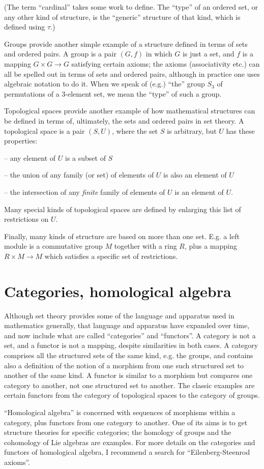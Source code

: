 \documentclass[12pt]{article}
\begin{document}
(The term ``cardinal'' takes some work to define.
The ``type'' of an ordered set, or any other kind of structure, is the
``generic'' structure of that kind, which is defined using $\tau$.)

Groups provide another simple example of a structure defined in terms of sets
and ordered pairs. A group is a pair $(G,f)$ in which $G$ is just a set, and
$f$ is a mapping $G\times G\to G$ satisfying certain axioms; the axioms
(associativity etc.) can all be spelled out in terms of sets and ordered
pairs, although in practice one uses algebraic notation to do it. When we
speak of (e.g.) ``the'' group $S_3$ of permutations of
a 3-element set, we mean the ``type'' of such a group.

Topological spaces provide another example of how mathematical structures
can be defined in terms of, ultimately, the sets and ordered pairs in set
theory. A topological space is a pair $(S,U)$, where the set $S$ is
arbitrary, but $U$ has these properties:

-- any element of $U$ is a subset of $S$

-- the union of any family (or set) of elements of $U$ is also an element of $U$

-- the intersection of any \emph{finite} family of elements of $U$ is an element of $U$.

Many special kinds of topological spaces are defined by enlarging this list
of restrictions on $U$.

Finally, many kinds of structure are based on more than one set. E.g. a
left module is a commutative group $M$ together with a ring $R$,
plus a mapping $R\times M\to M$ which satisfies a specific set of
restrictions.
\section{Categories, homological algebra}
Although set theory provides some of the language and apparatus used
in mathematics generally, that language and apparatus have expanded
over time, and now include what are called ``categories'' and ``functors''.
A category is not a set, and a functor is not a mapping, despite
similarities in both cases. A category comprises all the structured
sets of the same kind, e.g. the groups, and contains also a
definition of the notion of a morphism from one such structured
set to another of the same kind. A functor is similar to a morphism but
compares one category to another, not one structured set to another.
The classic examples are certain functors from the category of topological
spaces to the category of groups.

``Homological algebra'' is concerned with sequences of morphisms
within a category, plus functors from one category to another.
One of its aims is to get structure theories for specific categories;
the homology of groups and the cohomology of Lie algebras are examples.
For more details on the categories and functors of homological algebra, I
recommend a search for ``Eilenberg-Steenrod axioms''.
\end{document}
